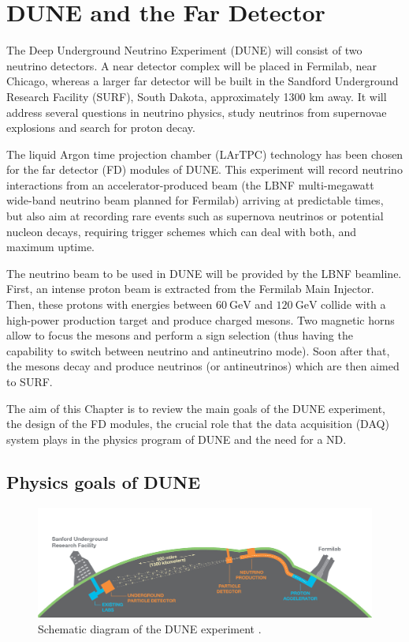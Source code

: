 \chapter{DUNE and the Far Detector}
\label{chapter:dune_fd}

The Deep Underground Neutrino Experiment (DUNE) \cite{DUNE2020TDR1} will consist of two neutrino detectors. A near detector complex will be placed in Fermilab, near Chicago, whereas a larger far detector will be built in the Sandford Underground Research Facility (SURF), South Dakota, approximately 1300 km away. It will address several questions in neutrino physics, study neutrinos from supernovae explosions and search for proton decay.

The liquid Argon time projection chamber (LArTPC) technology has been chosen for the far detector (FD) modules of DUNE. This experiment will record neutrino interactions from an accelerator-produced beam (the LBNF multi-megawatt wide-band neutrino beam planned for Fermilab) arriving at predictable times, but also aim at recording rare events such as supernova neutrinos or potential nucleon decays, requiring trigger schemes which can deal with both, and maximum uptime.

The neutrino beam to be used in DUNE will be provided by the LBNF beamline. First, an intense proton beam is extracted from the Fermilab Main Injector. Then, these protons with energies between $60 \ \mathrm{GeV}$ and $120 \ \mathrm{GeV}$ collide with a high-power production target and produce charged mesons. Two magnetic horns allow to focus the mesons and perform a sign selection (thus having the capability to switch between neutrino and antineutrino mode). Soon after that, the mesons decay and produce neutrinos (or antineutrinos) which are then aimed to SURF.

The aim of this Chapter is to review the main goals of the DUNE experiment, the design of the FD modules, the crucial role that the data acquisition (DAQ) system plays in the physics program of DUNE and the need for a ND.

\section{Physics goals of DUNE}

\begin{figure}[t]
	\centering
	\includegraphics[width=0.9\linewidth]{Images/DUNE/FD/dune}
	\caption{Schematic diagram of the DUNE experiment \cite{DUNE2020TDR}.}
	\label{fig:dune}
\end{figure}


